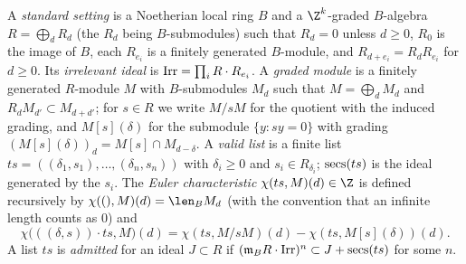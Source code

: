 \begin{definition}\label{pf:vwin-he:std}
A \emph{standard setting} is a Noetherian local ring $B$ and a $\Z^k$-graded $B$-algebra $R=\bigoplus_dR_d$ (the
$R_d$ being $B$-submodules) such that $R_d=0$ unless $d\ge0$, $R_0$ is the image of $B$, each $R_{e_i}$ is a
finitely generated $B$-module, and $R_{d+e_i}=R_dR_{e_i}$ for $d\ge0$. Its \emph{irrelevant ideal} is
$\operatorname{Irr}=\prod_iR\cdot R_{e_i}$. A \emph{graded module} is a finitely generated $R$-module $M$ with $B$-submodules
$M_d$ such that $M=\bigoplus_dM_d$ and $R_dM_{d'}\subset M_{d+d'}$; for $s\in R$ we write $M/sM$ for the quotient
with the induced grading, and $M[s](\delta)$ for the submodule $\{y:sy=0\}$ with grading $(M[s](\delta))_d=M[s]\cap
M_{d-\delta}$. A \emph{valid list} is a finite list $ts=((\delta_1,s_1),\dots,(\delta_n,s_n))$ with $\delta_i\ge0$
and $s_i\in R_{\delta_i}$; $\operatorname{secs}(ts)$ is the ideal generated by the $s_i$. The \emph{Euler characteristic}
$\chi(ts,M)(d)\in\Z$ is defined recursively by $\chi((),M)(d)=\len_BM_d$ (with the convention that an infinite
length counts as $0$) and
\[
 \chi\bigl(((\delta,s))\cdot ts,M\bigr)(d)=\chi(ts,M/sM)(d)-\chi(ts,M[s](\delta))(d).
\]
A list $ts$ is \emph{admitted} for an ideal $J\subset R$ if $(\mathfrak m_BR\cdot\operatorname{Irr})^n\subset
J+\operatorname{secs}(ts)$ for some $n$.
\end{definition}

